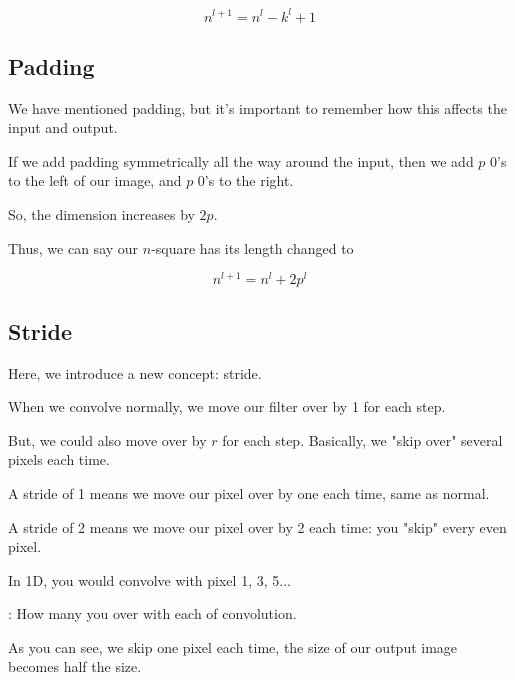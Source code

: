         \begin{equation*}
            n^{l+1} = n^l-k^l+1
        \end{equation*}
        
        
    
    \subsection{Padding}
        
        We have mentioned padding, but it's important to remember how this affects the input and output.
        
        If we add padding symmetrically all the way around the input, then we add $p$ 0's to the left of our image, and $p$ 0's to the right. 
        
        So, the dimension increases by $2p$.
        
        Thus, we can say our $n$-square has its length changed to 
        
        \begin{equation*}
            n^{l+1} = n^l+2p^l
        \end{equation*}
        
    \subsection{Stride}
    
        Here, we introduce a new concept: stride.
        
        When we convolve normally, we move our filter over by 1 for each step.
        
        But, we could also move over by $r$ for each step. Basically, we "skip over" several pixels each time. 
        
        A stride of 1 means we move our pixel over by one each time, same as normal.
        
        A stride of 2 means we move our pixel over by 2 each time: you "skip" every even pixel.
        
        In 1D, you would convolve with pixel 1, 3, 5...\\
        
        \begin{definition}
            : How many  you  over with each \purp of convolution.
        \end{definition}
        
        As you can see, we skip one pixel each time, the size of our output image becomes half the size.
        
